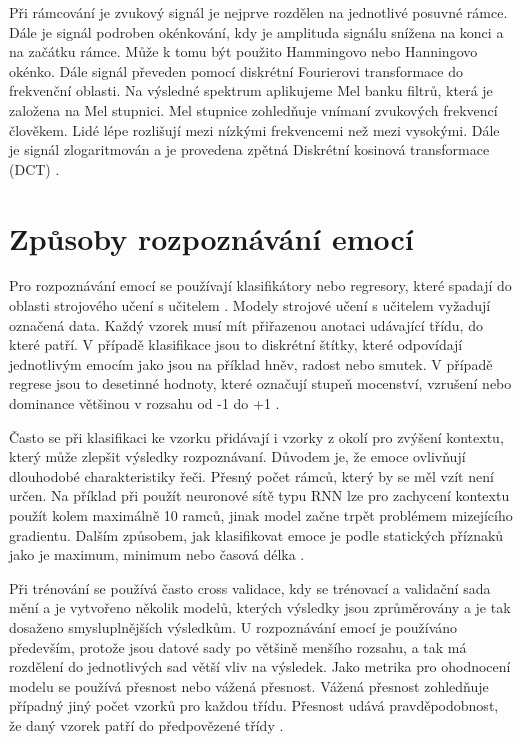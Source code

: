 \documentclass[FM,BP]{tulthesis}
\begin{document}
Při rámcování je zvukový signál je nejprve rozdělen na jednotlivé posuvné rámce. Dále je signál podroben okénkování, kdy je amplituda signálu snížena na konci a na začátku rámce. Může k tomu být použito Hammingovo nebo Hanningovo okénko. Dále signál převeden pomocí diskrétní Fourierovi transformace do frekvenční oblasti. Na výsledné spektrum aplikujeme Mel banku filtrů, která je založena na Mel stupnici. Mel stupnice zohledňuje vnímaní zvukových frekvencí člověkem. Lidé lépe rozlišují mezi nízkými frekvencemi než mezi vysokými. Dále je signál zlogaritmován a je provedena zpětná Diskrétní kosinová transformace (DCT) \cite{hui_2019}.

\section{Způsoby rozpoznávání emocí}
Pro rozpoznávání emocí se používají klasifikátory nebo regresory, které spadají do oblasti strojového učení s učitelem \cite{DBLP:journals/speech/AkcayO20}. Modely strojové učení s učitelem vyžadují označená data. Každý vzorek musí mít přiřazenou anotaci udávající třídu, do které patří. V případě klasifikace jsou to diskrétní štítky, které odpovídají jednotlivým emocím jako jsou na příklad hněv, radost nebo smutek. V případě regrese jsou to desetinné hodnoty, které označují stupeň mocenství, vzrušení nebo dominance většinou v rozsahu od -1 do +1 \cite{konar_chakraborty_2015}.

Často se při klasifikaci ke vzorku přidávají i vzorky z okolí pro zvýšení kontextu, který může zlepšit výsledky rozpoznávaní. Důvodem je, že emoce ovlivňují dlouhodobé charakteristiky řeči. Přesný počet rámců, který by se měl vzít není určen. Na příklad při použít neuronové sítě typu RNN lze pro zachycení kontextu použít kolem maximálně 10 ramců, jinak model začne trpět problémem mizejícího gradientu. Dalším způsobem, jak klasifikovat emoce je podle statických příznaků jako je maximum, minimum nebo časová délka \cite{konar_chakraborty_2015}.

Při trénování se používá často cross validace, kdy se trénovací a validační sada mění a je vytvořeno několik modelů, kterých výsledky jsou zprůměrovány a je tak dosaženo smysluplnějších výsledkům. U rozpoznávání emocí je používáno především, protože jsou datové sady po většině menšího rozsahu, a tak má rozdělení do jednotlivých sad větší vliv na výsledek. Jako metrika pro ohodnocení modelu se používá přesnost nebo vážená přesnost. Vážená přesnost zohledňuje případný jiný počet vzorků pro každou třídu. Přesnost udává pravděpodobnost, že daný vzorek patří do předpovězené třídy \cite{konar_chakraborty_2015}.
\end{document}

